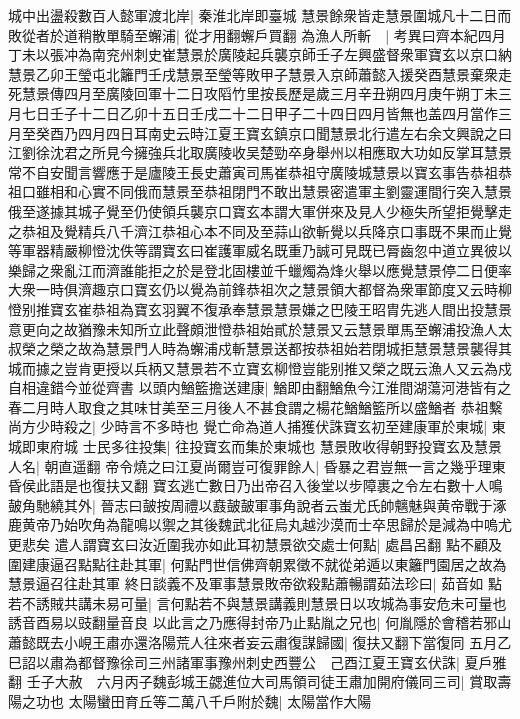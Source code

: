 城中出盪殺數百人懿軍渡北岸|{
	秦淮北岸即臺城}
慧景餘衆皆走慧景圍城凡十二日而敗從者於道稍散單騎至蠏浦|{
	從才用翻蠏戶買翻}
為漁人所斬　|{
	考異曰齊本紀四月丁未以張冲為南兖州刺史崔慧景於廣陵起兵襲京師壬子左興盛督衆軍寶玄以京口納慧景乙卯王瑩屯北籬門壬戌慧景至瑩等敗甲子慧景入京師蕭懿入援癸酉慧景棄衆走死慧景傳四月至廣陵回軍十二日攻䧟竹里按長歷是歲三月辛丑朔四月庚午朔丁未三月七日壬子十二日乙卯十五日壬戌二十二日甲子二十四日四月皆無也盖四月當作三月至癸酉乃四月四日耳南史云時江夏王寶玄鎮京口聞慧景北行遣左右余文興說之曰江劉徐沈君之所見今擁強兵北取廣陵收吴楚勁卒身舉州以相應取大功如反掌耳慧景常不自安聞言響應于是廬陵王長史蕭寅司馬崔恭祖守廣陵城慧景以寶玄事告恭祖恭祖口雖相和心實不同俄而慧景至恭祖閉門不敢出慧景密遣軍主劉靈運間行突入慧景俄至遂據其城子覺至仍使領兵襲京口寶玄本謂大軍併來及見人少極失所望拒覺擊走之恭祖及覺精兵八千濟江恭祖心本不同及至蒜山欲斬覺以兵降京口事既不果而止覺等軍器精嚴柳憕沈佚等謂寶玄曰崔護軍威名既重乃誠可見既已脣齒忽中道立異彼以樂歸之衆亂江而濟誰能拒之於是登北固樓並千蠟燭為烽火舉以應覺慧景停二日便率大衆一時俱濟趣京口寶玄仍以覺為前鋒恭祖次之慧景領大都督為衆軍節度又云時柳憕别推寶玄崔恭祖為寶玄羽翼不復承奉慧景慧景嫌之巴陵王昭胄先逃人間出投慧景意更向之故猶豫未知所立此聲頗泄憕恭祖始貳於慧景又云慧景單馬至蠏浦投漁人太叔榮之榮之故為慧景門人時為蠏浦戍斬慧景送都按恭祖始若閉城拒慧景慧景襲得其城而據之豈肯更授以兵柄又慧景若不立寶玄柳憕豈能别推又榮之既云漁人又云為戍自相違錯今並從齊書}
以頭内鰌籃擔送建康|{
	鰌即由翻鰌魚今江淮間湖蕩河港皆有之春二月時人取食之其味甘美至三月後人不甚食謂之楊花鰌鰌籃所以盛鰌者}
恭祖繫尚方少時殺之|{
	少時言不多時也}
覺亡命為道人捕獲伏誅寶玄初至建康軍於東城|{
	東城即東府城}
士民多往投集|{
	往投寶玄而集於東城也}
慧景敗收得朝野投寶玄及慧景人名|{
	朝直遥翻}
帝令燒之曰江夏尚爾豈可復罪餘人|{
	昏暴之君豈無一言之幾乎理東昏侯此語是也復扶又翻}
寶玄逃亡數日乃出帝召入後堂以步障裹之令左右數十人鳴皷角馳繞其外|{
	晉志曰皷按周禮以鼖皷皷軍事角說者云蚩尤氏帥魑魅與黄帝戰于涿鹿黄帝乃始吹角為龍鳴以禦之其後魏武北征烏丸越沙漠而士卒思歸於是減為中嗚尤更悲矣}
遣人謂寶玄曰汝近圍我亦如此耳初慧景欲交處士何點|{
	處昌呂翻}
點不顧及圍建康逼召點點往赴其軍|{
	何點門世信佛齊朝累徵不就從弟遁以東籬門園居之故為慧景逼召往赴其軍}
終日談義不及軍事慧景敗帝欲殺點蕭暢謂茹法珍曰|{
	茹音如}
點若不誘賊共講未易可量|{
	言何點若不與慧景講義則慧景日以攻城為事安危未可量也誘音酉易以豉翻量音良}
以此言之乃應得封帝乃止點胤之兄也|{
	何胤隱於會稽若邪山}
蕭懿既去小峴王肅亦還洛陽荒人往來者妄云肅復謀歸國|{
	復扶又翻下當復同}
五月乙巳詔以肅為都督豫徐司三州諸軍事豫州刺史西豐公　己酉江夏王寶玄伏誅|{
	夏戶雅翻}
壬子大赦　六月丙子魏彭城王勰進位大司馬領司徒王肅加開府儀同三司|{
	賞取壽陽之功也}
太陽蠻田育丘等二萬八千戶附於魏|{
	太陽當作大陽}
